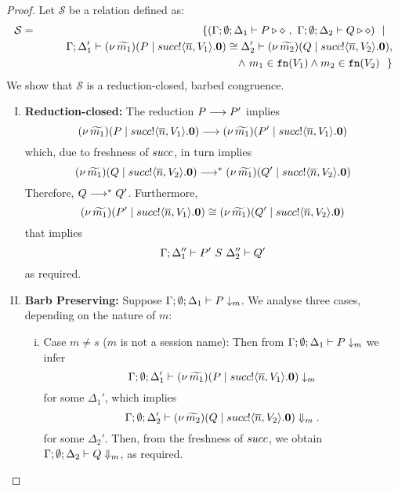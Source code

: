 \begin{proof}
	\noi Let $\mathcal{S}$ be a relation defined as:
%
	\begin{eqnarray*}
		\mathcal{S}	&=&
					\{(\Gamma; \emptyset; \Delta_1 \vdash P \triangleright \diamond\ ,\ \Gamma; \emptyset; \Delta_2 \vdash Q \triangleright \diamond) \ \ |\ \  \\
				& &	\qquad \Gamma; \Delta_1' \vdash (\nu\, \widetilde{m_1})(P \;|\; succ ! \langle \overline{n}, V_1 \rangle . \mathbf{0}) \cong \Delta'_2 \vdash (\nu\, \widetilde{m_2})(Q \;|\; succ ! \langle \overline{n}, V_2 \rangle . \mathbf{0}),\\
				&&   \qquad \land~ m_1 \in \mathtt{fn}(V_1) \land m_2 \in\mathtt{fn}(V_2) ~~\}
	\end{eqnarray*}
%
	\noi We show that $\mathcal{S}$ is a reduction-closed, barbed congruence.


	\begin{enumerate}[I.]
		\item	{\bf Reduction-closed:} The reduction  $P \longrightarrow P'$
				implies
				\[
					(\nu\, \widetilde{m_1})(P \;|\; succ ! \langle \overline{n}, V_1 \rangle . \mathbf{0})
					\longrightarrow
					(\nu\, \widetilde{m_1})(P' \;|\; succ ! \langle \overline{n}, V_1 \rangle . \mathbf{0})
				\]
				which, due to freshness of $succ$, in turn implies
				\[
					(\nu\, \widetilde{m_1})(Q \;|\; succ ! \langle \overline{n}, V_2 \rangle . \mathbf{0})
					\longrightarrow^{*}
					(\nu\, \widetilde{m_1})(Q' \;|\; succ ! \langle \overline{n}, V_2 \rangle . \mathbf{0})
				\]
				Therefore, $Q \longrightarrow^{*} Q'$. Furthermore,
				\[
					(\nu\, \widetilde{m_1})(P' \;|\; succ ! \langle \overline{n}, V_1 \rangle . \mathbf{0}) \cong 
					(\nu\, \widetilde{m_1})(Q' \;|\; succ ! \langle \overline{n}, V_2 \rangle . \mathbf{0})
				\]
				that implies
				\[
					\Gamma; \Delta_1'' \vdash P'\ S\ \Delta_2'' \vdash  Q'
				\]
				as required.

	\item	{\bf Barb Preserving:} Suppose $\Gamma; \emptyset; \Delta_1 \vdash P \downarrow_{m}$. We analyse three cases, depending on the nature of $m$:
		    \begin{enumerate}[i)]
				\item	Case $m \not= s$ ($m$ is not a session name): Then from
						$\Gamma; \emptyset; \Delta_1 \vdash P \downarrow_{m}$
						we infer 
						\[
							\Gamma; \emptyset; \Delta_1' \vdash
							(\nu\, \widetilde{m_1})(P \;|\; succ ! \langle \overline{n}, V_1 \rangle . \mathbf{0})
							\downarrow_{m} 
						\]
						for some $\Delta_1'$, which implies
						\[
							\Gamma; \emptyset; \Delta_2' \vdash
							(\nu\, \widetilde{m_2})(Q \;|\; succ ! \langle \overline{n}, V_2 \rangle . \mathbf{0})
							\Downarrow_{m}.
						\]
						for some $\Delta_2'$.
						Then, from the freshness of $succ$, we obtain 
						$\Gamma; \emptyset; \Delta_2 \vdash Q \Downarrow_{m}$, as required.


\end{enumerate}
\end{enumerate}
\end{proof}
